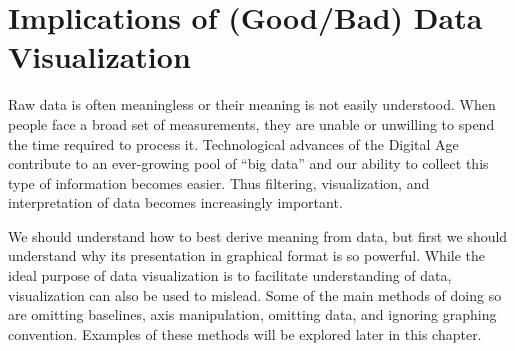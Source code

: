 \documentclass[]{book}
\theoremstyle{definition}
\theoremstyle{definition}
\theoremstyle{definition}
\theoremstyle{remark}
\begin{document}
\section{Implications of (Good/Bad) Data
Visualization}\label{implications-of-goodbad-data-visualization}

Raw data is often meaningless or their meaning is not easily understood.
When people face a broad set of measurements, they are unable or
unwilling to spend the time required to process it. Technological
advances of the Digital Age contribute to an ever-growing pool of ``big
data'' and our ability to collect this type of information becomes
easier. Thus filtering, visualization, and interpretation of data
becomes increasingly important.

We should understand how to best derive meaning from data, but first we
should understand why its presentation in graphical format is so
powerful. While the ideal purpose of data visualization is to facilitate
understanding of data, visualization can also be used to mislead. Some
of the main methods of doing so are omitting baselines, axis
manipulation, omitting data, and ignoring graphing convention. Examples
of these methods will be explored later in this chapter.
\end{document}
